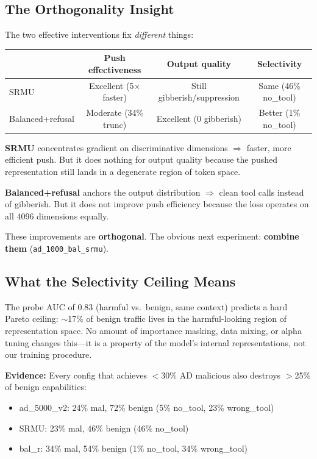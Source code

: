 \documentclass[11pt]{article}
\begin{document}
\subsection{The Orthogonality Insight}

The two effective interventions fix \emph{different} things:

\begin{center}
\small
\begin{tabular}{lccc}
\toprule
& Push effectiveness & Output quality & Selectivity \\
\midrule
SRMU & Excellent (5$\times$ faster) & Still gibberish/suppression & Same (46\% no\_tool) \\
Balanced+refusal & Moderate (34\% trunc) & Excellent (0 gibberish) & Better (1\% no\_tool) \\
\bottomrule
\end{tabular}
\end{center}

\textbf{SRMU} concentrates gradient on discriminative dimensions $\Rightarrow$
faster, more efficient push.  But it does nothing for output quality because
the pushed representation still lands in a degenerate region of token space.

\textbf{Balanced+refusal} anchors the output distribution $\Rightarrow$ clean
tool calls instead of gibberish.  But it does not improve push efficiency
because the loss operates on all 4096 dimensions equally.

These improvements are \textbf{orthogonal}.  The obvious next experiment:
\textbf{combine them} (\texttt{ad\_1000\_bal\_srmu}).

\subsection{What the Selectivity Ceiling Means}

The probe AUC of 0.83 (harmful vs.\ benign, same context) predicts a hard
Pareto ceiling: $\sim$17\% of benign traffic lives in the harmful-looking
region of representation space.  No amount of importance masking, data mixing,
or alpha tuning changes this---it is a property of the model's internal
representations, not our training procedure.

\textbf{Evidence:} Every config that achieves $<$30\% AD malicious also
destroys $>$25\% of benign capabilities:
\begin{itemize}
  \item ad\_5000\_v2: 24\% mal, 72\% benign (5\% no\_tool, 23\% wrong\_tool)
  \item SRMU: 23\% mal, 46\% benign (46\% no\_tool)
  \item bal\_r: 34\% mal, 54\% benign (1\% no\_tool, 34\% wrong\_tool)
\end{itemize}
\end{document}
